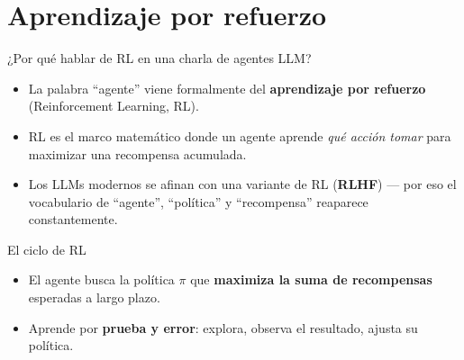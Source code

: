 \section{Aprendizaje por refuerzo}

\begin{frame}{¿Por qué hablar de RL en una charla de agentes LLM?}
  \begin{itemize}
    \item La palabra ``agente'' viene formalmente del \textbf{aprendizaje por
      refuerzo} (Reinforcement Learning, RL).
    \item RL es el marco matemático donde un agente aprende \emph{qué acción
      tomar} para maximizar una recompensa acumulada.
    \item Los LLMs modernos se afinan con una variante de RL
      (\textbf{RLHF}) — por eso el vocabulario de ``agente'', ``política''
      y ``recompensa'' reaparece constantemente.
  \end{itemize}
\end{frame}

\begin{frame}{El ciclo de RL}
  \centering
  \vfill
  \begin{itemize}
    \item El agente busca la política $\pi$ que \textbf{maximiza la suma de
      recompensas} esperadas a largo plazo.
    \item Aprende por \textbf{prueba y error}: explora, observa el resultado,
      ajusta su política.
  \end{itemize}
\end{frame}


